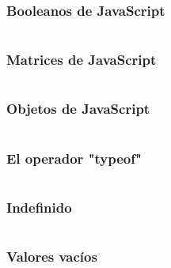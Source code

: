 \begin{frame}[fragile]
  \frametitle{Booleanos de JavaScript}

  \vspace{\baselineskip}
  \begin{lstlisting}
  \end{lstlisting}
\end{frame}

\begin{frame}[fragile]
  \frametitle{Matrices de JavaScript}

  \vspace{\baselineskip}
  \begin{lstlisting}
  \end{lstlisting}
\end{frame}

\begin{frame}[fragile]
  \frametitle{Objetos de JavaScript}

  \vspace{\baselineskip}
  \begin{lstlisting}
  \end{lstlisting}
\end{frame}

\begin{frame}[fragile]
  \frametitle{El operador "typeof"}

  \vspace{\baselineskip}
  \begin{lstlisting}
  \end{lstlisting}
\end{frame}

\begin{frame}[fragile]
  \frametitle{Indefinido}

  \vspace{\baselineskip}
  \begin{lstlisting}
  \end{lstlisting}
\end{frame}

\begin{frame}[fragile]
  \frametitle{Valores vacíos}

  \vspace{\baselineskip}
  \begin{lstlisting}
  \end{lstlisting}
\end{frame}

\begin{frame}[c]{}
\end{frame}

\begin{frame}[fragile]
  \frametitle{}

  \vspace{\baselineskip}
  \begin{lstlisting}
  \end{lstlisting}
\end{frame}

